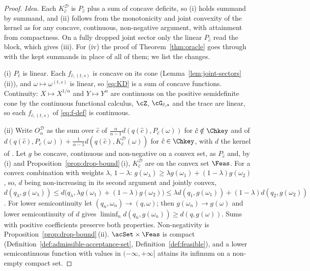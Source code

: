 \begin{proof}
\emph{Idea.} Each $K^{\mathcal{D}}_{\hat c}$ is $P_{\hat c}$ plus a sum of
concave deficits, so (i) holds summand by summand, and (ii) follows from the
monotonicity and joint convexity of the kernel as for any concave,
continuous, non-negative argument, with attainment from compactness. On a
fully dropped joint sector only the
linear $P_{\hat c}$ read the block, which gives (iii). For (iv) the proof of
Theorem~\ref{thm:oracle} goes through with the kept summands in place of
all of them; we list the changes.

(i) $P_{\hat c}$ is linear. Each $f_{\hat c,(t,s)}$ is concave on its cone
(Lemma~\ref{lem:joint-sectors}\,(ii)), and
$\omega\mapsto\omega^{(t,s)}$ is linear, so \eqref{eq:KD} is a sum of concave
functions. Continuity: $X\mapsto X^{1/\alpha}$ and $Y\mapsto Y^{\alpha}$ are
continuous on the positive semidefinite cone by the continuous functional
calculus, $\cZ$, $\cG_{\hat c,s}$ and the trace are linear, so each
$f_{\hat c,(t,s)}$ of \eqref{eq:f-def} is continuous.

(ii) Write $O^{\mathcal{D}}_{\alpha}$ as the sum over $\hat c$ of
$\frac{\alpha}{\alpha-1}d(q(\hat c),P_{\hat c}(\omega))$ for
$\hat c\notin\Chkey$ and of
$d(q(\hat c),P_{\hat c}(\omega))+\frac{1}{\alpha-1}
d(q(\hat c),K^{\mathcal{D}}_{\hat c}(\omega))$ for $\hat c\in\Chkey$, with
$d$ the kernel of . Let $g$ be concave, continuous and
non-negative on a convex set, as $P_{\hat c}$ and, by (i) and
Proposition~\ref{prop:drop-bound}\,(i), $K^{\mathcal{D}}_{\hat c}$ are on the
convex set $\Feas$. For a convex combination with weights $\lambda$,
$1-\lambda$: $g(\omega_{\lambda})\ge\lambda g(\omega_1)+(1-\lambda)g(\omega_2)$,
so, $d$ being non-increasing in its second argument and jointly convex,
$d(q_{\lambda},g(\omega_{\lambda}))\le
d\big(q_{\lambda},\lambda g(\omega_1)+(1-\lambda)g(\omega_2)\big)\le
\lambda d(q_1,g(\omega_1))+(1-\lambda)d(q_2,g(\omega_2))$. For lower
semicontinuity let $(q_n,\omega_n)\to(q,\omega)$; then
$g(\omega_n)\to g(\omega)$ and lower semicontinuity of $d$ gives
$\liminf_nd(q_n,g(\omega_n))\ge d(q,g(\omega))$. Sums with positive
coefficients preserve both properties. Non-negativity is
Proposition~\ref{prop:drop-bound}\,(ii). $\acSet\times\Feas$ is compact
(Definition~\ref{def:admissible-acceptance-set}, Definition~\ref{def:feasible}), and a lower
semicontinuous function with values in $(-\infty,+\infty]$ attains its
infimum on a non-empty compact set.


\end{proof}
